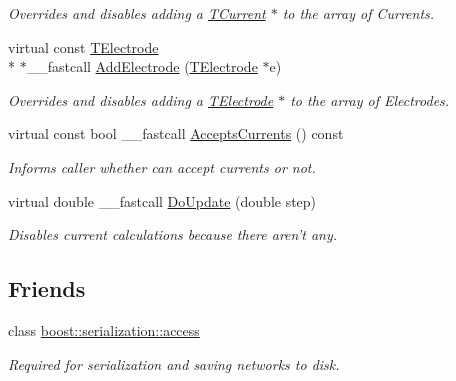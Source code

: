 \begin{DoxyCompactItemize}
\begin{DoxyCompactList}\small\item\em Overrides and disables adding a \hyperlink{class_t_current}{T\+Current} $\ast$ to the array of Currents. \end{DoxyCompactList}\item 
\hypertarget{class_t_playback_cell_a736a499f823cd99dc2fb0c30c9940d40}{virtual const \hyperlink{class_t_electrode}{T\+Electrode} \\*
$\ast$\+\_\+\+\_\+fastcall \hyperlink{class_t_playback_cell_a736a499f823cd99dc2fb0c30c9940d40}{Add\+Electrode} (\hyperlink{class_t_electrode}{T\+Electrode} $\ast$e)}\label{class_t_playback_cell_a736a499f823cd99dc2fb0c30c9940d40}

\begin{DoxyCompactList}\small\item\em Overrides and disables adding a \hyperlink{class_t_electrode}{T\+Electrode} $\ast$ to the array of Electrodes. \end{DoxyCompactList}\item 
\hypertarget{class_t_playback_cell_a6f8d8d938e012adc17c8cd44e936e1b6}{virtual const bool \+\_\+\+\_\+fastcall \hyperlink{class_t_playback_cell_a6f8d8d938e012adc17c8cd44e936e1b6}{Accepts\+Currents} () const }\label{class_t_playback_cell_a6f8d8d938e012adc17c8cd44e936e1b6}

\begin{DoxyCompactList}\small\item\em Informs caller whether can accept currents or not. \end{DoxyCompactList}\item 
\hypertarget{class_t_playback_cell_a16763fa74c03646eface33316a938756}{virtual double \+\_\+\+\_\+fastcall \hyperlink{class_t_playback_cell_a16763fa74c03646eface33316a938756}{Do\+Update} (double step)}\label{class_t_playback_cell_a16763fa74c03646eface33316a938756}

\begin{DoxyCompactList}\small\item\em Disables current calculations because there aren't any. \end{DoxyCompactList}\end{DoxyCompactItemize}
\subsection*{Friends}
\begin{DoxyCompactItemize}
\item 
\hypertarget{class_t_playback_cell_ac98d07dd8f7b70e16ccb9a01abf56b9c}{class \hyperlink{class_t_playback_cell_ac98d07dd8f7b70e16ccb9a01abf56b9c}{boost\+::serialization\+::access}}\label{class_t_playback_cell_ac98d07dd8f7b70e16ccb9a01abf56b9c}

\begin{DoxyCompactList}\small\item\em Required for serialization and saving networks to disk. \end{DoxyCompactList}\end{DoxyCompactItemize}
